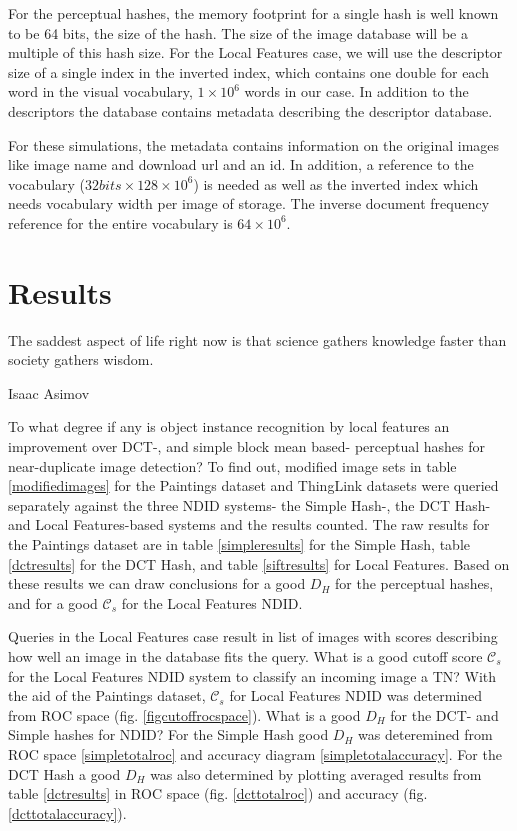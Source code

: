 \documentclass[english,12pt,a4paper,pdftex,elec,utf8, table]{aaltothesis}
\begin{document}
For the perceptual hashes, the memory footprint for a single hash is well known to be 64 bits, the size of the hash. The size of the image database will be a multiple of this hash size. For the Local Features case, we will use the descriptor size of a single index in the inverted index, which contains one double for each word in the visual vocabulary, $1\times10^6$ words in our case. In addition to the descriptors the database contains metadata describing the descriptor database.

For these simulations, the metadata contains information on the original images like image name and download url and an id. In addition, a reference to the vocabulary ($32 bits \times 128 \times 10^6$) is needed as well as the inverted index which needs vocabulary width per image of storage. The inverse document frequency reference for the entire vocabulary is $64 \times 10^6$.
\clearpage

\section{Results}
\epigraph{The saddest aspect of life right now is that science gathers knowledge faster than society gathers wisdom.}{Isaac Asimov}
To what degree if any is object instance recognition by local features an improvement over DCT-, and simple block mean based- perceptual hashes for near-duplicate image detection? To find out, modified image sets in table \ref{modifiedimages} for the Paintings dataset and ThingLink datasets were queried separately against the three NDID systems- the Simple Hash-, the DCT Hash- and Local Features-based systems and the results counted. The raw results for the Paintings dataset are in table \ref{simpleresults} for the Simple Hash, table \ref{dctresults} for the DCT Hash, and table \ref{siftresults} for Local Features. Based on these results we can draw conclusions for a good $D_H$ for the perceptual hashes, and for a good $\mathcal{C}_s$ for the Local Features NDID.

Queries in the Local Features case result in list of images with scores describing how well an image in the database fits the query. What is a good cutoff score $\mathcal{C}_s$ for the Local Features NDID system to classify an incoming image a TN? With the aid of the Paintings dataset, $\mathcal{C}_s$ for Local Features NDID was determined from ROC space (fig. \ref{figcutoffrocspace}). What is a good $D_H$ for the DCT- and Simple hashes for NDID? For the Simple Hash good $D_H$ was deteremined from ROC space \ref{simpletotalroc} and accuracy diagram \ref{simpletotalaccuracy}. For the DCT Hash a good $D_H$ was also determined by plotting averaged results from table \ref{dctresults} in ROC space (fig. \ref{dcttotalroc}) and accuracy (fig. \ref{dcttotalaccuracy}).
\end{document}
